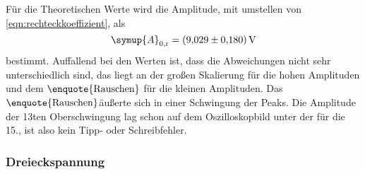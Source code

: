 Für die Theoretischen Werte wird die Amplitude, mit umstellen von
\eqref{eqn:rechteckko­ef­fi­zi­ent}, als
\begin{equation}
  \symup{A}_{0,\text{r}} = \SI{9.029(180)}{\volt}
\end{equation}
bestimmt.
Auffallend bei den Werten ist, dass die Abweichungen nicht sehr unterschiedlich
sind, das liegt an der großen Skalierung für die hohen Amplituden und dem
$\enquote{\text{Rauschen}}$ für die kleinen Amplituden. Das
$\enquote{\text{Rauschen}}$äußerte sich in einer Schwingung der Peaks.
Die Amplitude der 13ten Oberschwingung lag schon auf dem Oszilloskopbild unter
der für die 15., ist also kein Tipp- oder Schreibfehler.

\newpage

\subsubsection{Dreieckspannung}

